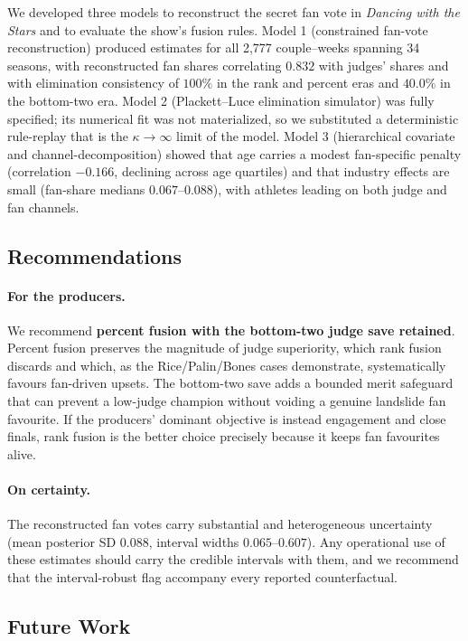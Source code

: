 \documentclass{article}
\begin{document}
We developed three models to reconstruct the secret fan vote in \emph{Dancing with the
Stars} and to evaluate the show's fusion rules. Model 1 (constrained fan-vote
reconstruction) produced estimates for all 2{,}777 couple--weeks spanning 34 seasons, with
reconstructed fan shares correlating $0.832$ with judges' shares and with elimination
consistency of $100\%$ in the rank and percent eras and $40.0\%$ in the bottom-two era. Model
2 (Plackett--Luce elimination simulator) was fully specified; its numerical fit was not
materialized, so we substituted a deterministic rule-replay that is the $\kappa\to\infty$
limit of the model. Model 3 (hierarchical covariate and channel-decomposition) showed that
age carries a modest fan-specific penalty (correlation $-0.166$, declining across age
quartiles) and that industry effects are small (fan-share medians $0.067$--$0.088$), with
athletes leading on both judge and fan channels.

\subsection{Recommendations}

\paragraph{For the producers.} We recommend \textbf{percent fusion with the bottom-two judge
save retained}. Percent fusion preserves the magnitude of judge superiority, which rank
fusion discards and which, as the Rice/Palin/Bones cases demonstrate, systematically favours
fan-driven upsets. The bottom-two save adds a bounded merit safeguard that can prevent a
low-judge champion without voiding a genuine landslide fan favourite. If the producers'
dominant objective is instead engagement and close finals, rank fusion is the better choice
precisely because it keeps fan favourites alive.

\paragraph{On certainty.} The reconstructed fan votes carry substantial and heterogeneous
uncertainty (mean posterior SD $0.088$, interval widths $0.065$--$0.607$). Any operational
use of these estimates should carry the credible intervals with them, and we recommend that
the interval-robust flag accompany every reported counterfactual.

\subsection{Future Work}
\end{document}

